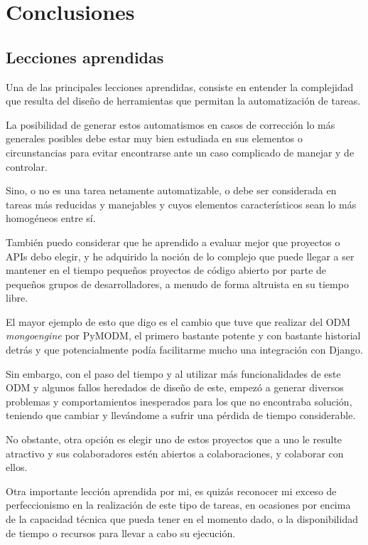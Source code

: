 \cleardoublepage
\chapter{Conclusiones}
\label{chap:conclusiones}

\section{Lecciones aprendidas}

Una de las principales lecciones aprendidas, consiste en entender la complejidad que resulta del diseño de herramientas que permitan la automatización de tareas.


La posibilidad de generar estos automatismos en casos de corrección lo más generales posibles debe estar muy bien estudiada en sus elementos o circunstancias para evitar encontrarse ante un caso complicado de manejar y de controlar.


Sino, o no es una tarea netamente automatizable, o debe ser considerada en tareas más reducidas y manejables y cuyos elementos característicos sean lo más homogéneos entre sí.


También puedo considerar que he aprendido a evaluar mejor que proyectos o APIs debo elegir, y he adquirido la noción de lo complejo que puede llegar a ser mantener en el tiempo pequeños proyectos de código abierto por parte de pequeños grupos de desarrolladores, a menudo de forma altruista en su tiempo libre.


El mayor ejemplo de esto que digo es el cambio que tuve que realizar del ODM \textit{mongoengine} por PyMODM, el primero bastante potente y con bastante historial detrás y que potencialmente podía facilitarme mucho una integración con Django.


Sin embargo, con el paso del tiempo y al utilizar más funcionalidades de este ODM y algunos fallos heredados de diseño de este, empezó a generar diversos problemas y comportamientos inesperados para los que no encontraba solución, teniendo que cambiar y llevándome a sufrir una pérdida de tiempo considerable.


No obstante, otra opción es elegir uno de estos proyectos que a uno le resulte atractivo y sus colaboradores estén abiertos a colaboraciones, y colaborar con ellos.


Otra importante lección aprendida por mi, es quizás reconocer mi exceso de perfeccionismo en la realización de este tipo de tareas, en ocasiones por encima de la capacidad técnica que pueda tener en el momento dado, o la disponibilidad de tiempo o recursos para llevar a cabo su ejecución.


